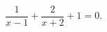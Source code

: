\begin{ex}[type=equation]
	\begin{condition}
		$\dfrac{1}{x - 1} + \dfrac{2}{x + 2} + 1 = 0.$
	\end{condition}
\end{ex}